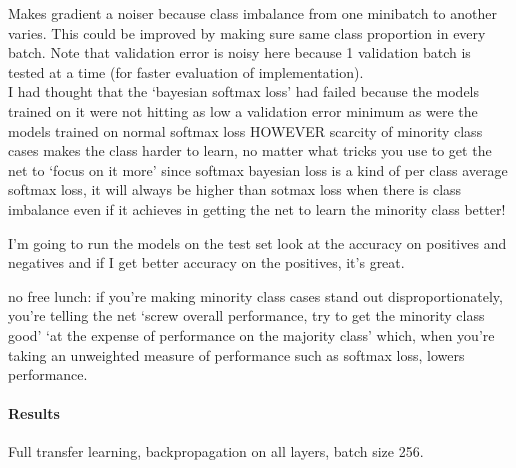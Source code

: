 \documentclass[a4paper,11pt]{article}
\begin{document}
Makes gradient a noiser because class imbalance from one minibatch to another varies. This could be improved by making sure same class proportion in every batch. Note that validation error is noisy here because 1 validation batch is tested at a time (for faster evaluation of implementation). \\

I had thought that the `bayesian softmax loss' had failed
because the models trained on it were not hitting as low a validation error minimum as were the models trained on normal softmax loss
HOWEVER 
scarcity of minority class cases makes the class harder to learn, no matter what tricks you use to get the net to `focus on it more'
since softmax bayesian loss is a kind of per class average softmax loss, it will always be higher than sotmax loss when there is class imbalance
even if it achieves in getting the net to learn the minority class better!

I'm going to run the models on the test set
look at the accuracy on positives and negatives
and if I get better accuracy on the positives, it's great. 

no free lunch: if you're making minority class cases stand out disproportionately, you're telling the net `screw overall performance, try to get the minority class good'
`at the expense of performance on the majority class'
which, when you're taking an unweighted measure of performance such as softmax loss, lowers performance.

\paragraph{Results}

Full transfer learning, backpropagation on all layers, batch size 256. \\
\end{document}
